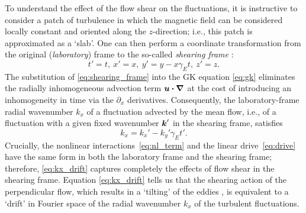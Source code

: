 \documentclass{jpp}
\newcommand{\gammaE}{\gamma_{E}}
\begin{document}
To understand the effect of the flow shear on the fluctuations, it is instructive to consider a patch of turbulence in which the magnetic field can be considered locally constant and oriented along the $z$-direction; i.e., this patch is approximated as a `slab'. One can then perform a coordinate transformation from the original (\textit{laboratory}) frame to the so-called \textit{shearing frame} \citep{newton10, sch12}:
\begin{equation}
	t' = t, \ x' = x, \ y' = y - x\gammaE t, \ z' = z.
	\label{eq:shearing_frame}
\end{equation}
The substitution of \cref{eq:shearing_frame} into the GK equation \cref{eq:gk} eliminates the radially inhomogeneous advection term \(\boldsymbol{u}\boldsymbol{\cdot}{\boldsymbol{\nabla}}\) at the cost of introducing an inhomogeneity in time via the \(\partial_x\) derivatives. Consequently, the laboratory-frame radial wavenumber \(k_x\) of a fluctuation advected by the mean flow, i.e., of a fluctuation with a given fixed wavenumber \({\boldsymbol{k}}'\) in the shearing frame, satisfies
\begin{equation}
	k_x = k_x' - k_y' \gammaE t'.
	\label{eq:kx_drift}
\end{equation}
Crucially, the nonlinear interactions~\cref{eq:nl_term} and the linear drive~\cref{eq:drive} have the same form in both the laboratory frame and the shearing frame; therefore, \cref{eq:kx_drift} captures completely the effects of flow shear in the shearing frame. Equation \cref{eq:kx_drift} tells us that the shearing action of the perpendicular flow, which results in a `tilting' of the eddies \citep{fox17}, is equivalent to a `drift' in Fourier space of the radial wavenumber \(k_x\) of the turbulent fluctuations. 
\end{document}

